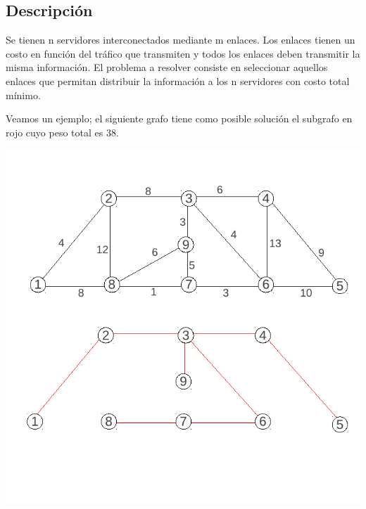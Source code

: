 \subsection{Descripción}
Se tienen n servidores interconectados mediante m enlaces. Los enlaces tienen un costo en función del tráfico que transmiten y todos los enlaces deben transmitir la misma información. El problema a resolver consiste en seleccionar aquellos enlaces que permitan distribuir la información a los n servidores con costo total mínimo.


Veamos un ejemplo; el siguiente grafo tiene como posible solución el subgrafo en rojo cuyo peso total es 38.

\begin{center}
\includegraphics{ej2/1/Img1.pdf} 
\end{center}

